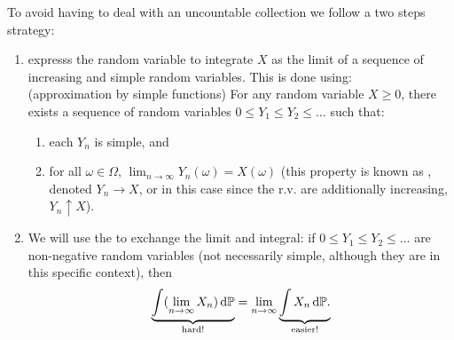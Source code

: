 \documentclass{article}
\begin{document}
To avoid having to deal with an uncountable collection we follow a two steps strategy:
\begin{enumerate}
  \item expresss the random variable to integrate $X$ as the limit of a sequence of increasing and simple random variables. This is done using: \\ (approximation by simple functions) For any random variable $X \ge 0$, there exists a sequence of random variables $0 \le Y_1 \le Y_2 \le \dots$ such that:
   \begin{enumerate}
     \item each $Y_n$ is simple, and
     \item for all $\omega \in \Omega$, $\lim_{n\to\infty} Y_n(\omega) = X(\omega)$ (this property is known as , denoted $Y_n \to X$, or in this case since the r.v. are additionally increasing, $Y_n \uparrow X$).
   \end{enumerate}
  \item We will use the  to exchange the limit and integral: if $0 \le Y_1 \le Y_2 \le \dots$ are non-negative random variables (not necessarily simple, although they are in this specific context), then 
\[ \underbrace{ \int (\lim_{n\to\infty} X_n) \,\mathrm{d} {\mathbb P}}_{\text{hard!}} = \lim_{n\to\infty} \underbrace{\int X_n \,\mathrm{d} {\mathbb P}.}_{\text{easier!}} \]
\end{enumerate}
\end{document}
